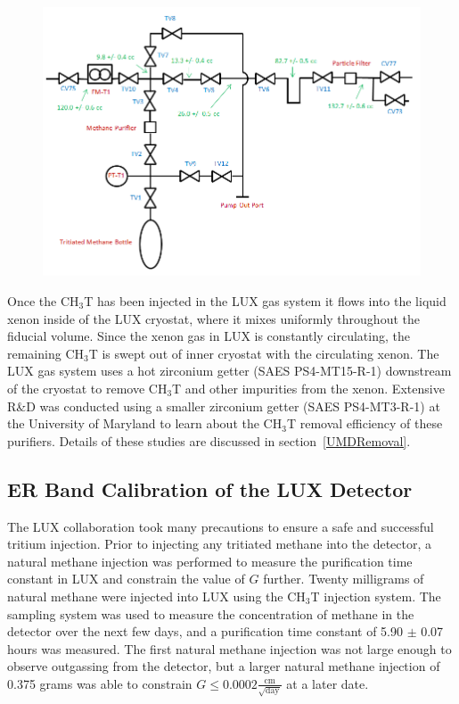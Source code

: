 \begin{figure} [!h]
\includegraphics[scale=.6]{TritiumPlumbing.png} 
\label{LUXInjectionSys}
\end{figure}

Once the CH$_3$T has been injected in the LUX gas system it flows into the liquid xenon inside of the LUX cryostat, where it mixes uniformly throughout the fiducial volume.  Since the xenon gas in LUX is constantly circulating, the remaining CH$_3$T is swept out of inner cryostat with the circulating xenon.  The LUX gas system uses a hot zirconium getter (SAES PS4-MT15-R-1) downstream of the cryostat to remove CH$_3$T and other impurities from the xenon. Extensive R\&D was conducted using a smaller zirconium getter (SAES PS4-MT3-R-1) at the University of Maryland to learn about the CH$_3$T removal efficiency of these purifiers. Details of these studies are discussed in section~\ref{UMDRemoval}.


\subsection{ER Band Calibration of the LUX Detector} \label{DiscrimSec}

The LUX collaboration took many precautions to ensure a safe and successful tritium injection. Prior to injecting any tritiated methane into the detector, a natural methane injection was performed to measure the purification time constant in LUX and constrain the value of $G$ further.   Twenty milligrams of natural methane were injected into LUX using the CH$_3$T injection system. The sampling system was used to measure the concentration of methane in the detector over the next few days, and a purification time constant of 5.90 $\pm$ 0.07 hours was measured.  The first natural methane injection was not large enough to observe outgassing from the detector, but a larger natural methane injection of 0.375 grams was able to constrain $G \le 0.0002 \frac{\text{cm}}{\sqrt{\text{day}}}$ at a later date.


